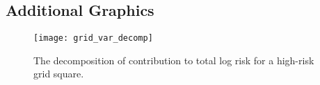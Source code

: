 \clearpage
\label{AppendixA}
\vspace{-1.75cm}
\subsection{Additional Graphics}


\begin{figure}[h!]
  \centering
  \caption{The decomposition of contribution to total log risk for a high-risk grid square.}
  \texttt{[image: grid\_var\_decomp]}
\end{figure}
